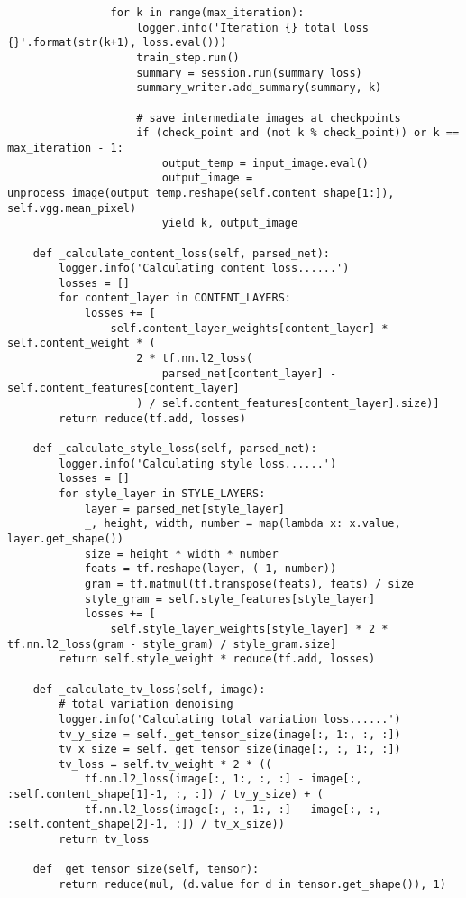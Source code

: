 \begin{spacing}{1}
\begin{lstlisting}
                for k in range(max_iteration):
                    logger.info('Iteration {} total loss {}'.format(str(k+1), loss.eval()))
                    train_step.run()
                    summary = session.run(summary_loss)
                    summary_writer.add_summary(summary, k)

                    # save intermediate images at checkpoints
                    if (check_point and (not k % check_point)) or k == max_iteration - 1:
                        output_temp = input_image.eval()
                        output_image = unprocess_image(output_temp.reshape(self.content_shape[1:]), self.vgg.mean_pixel)
                        yield k, output_image

    def _calculate_content_loss(self, parsed_net):
        logger.info('Calculating content loss......')
        losses = []
        for content_layer in CONTENT_LAYERS:
            losses += [
                self.content_layer_weights[content_layer] * self.content_weight * (
                    2 * tf.nn.l2_loss(
                        parsed_net[content_layer] - self.content_features[content_layer]
                    ) / self.content_features[content_layer].size)]
        return reduce(tf.add, losses)

    def _calculate_style_loss(self, parsed_net):
        logger.info('Calculating style loss......')
        losses = []
        for style_layer in STYLE_LAYERS:
            layer = parsed_net[style_layer]
            _, height, width, number = map(lambda x: x.value, layer.get_shape())
            size = height * width * number
            feats = tf.reshape(layer, (-1, number))
            gram = tf.matmul(tf.transpose(feats), feats) / size
            style_gram = self.style_features[style_layer]
            losses += [
                self.style_layer_weights[style_layer] * 2 * tf.nn.l2_loss(gram - style_gram) / style_gram.size]
        return self.style_weight * reduce(tf.add, losses)

    def _calculate_tv_loss(self, image):
        # total variation denoising
        logger.info('Calculating total variation loss......')
        tv_y_size = self._get_tensor_size(image[:, 1:, :, :])
        tv_x_size = self._get_tensor_size(image[:, :, 1:, :])
        tv_loss = self.tv_weight * 2 * ((
            tf.nn.l2_loss(image[:, 1:, :, :] - image[:, :self.content_shape[1]-1, :, :]) / tv_y_size) + (
            tf.nn.l2_loss(image[:, :, 1:, :] - image[:, :, :self.content_shape[2]-1, :]) / tv_x_size))
        return tv_loss

    def _get_tensor_size(self, tensor):
        return reduce(mul, (d.value for d in tensor.get_shape()), 1)

\end{lstlisting}
\end{spacing}


